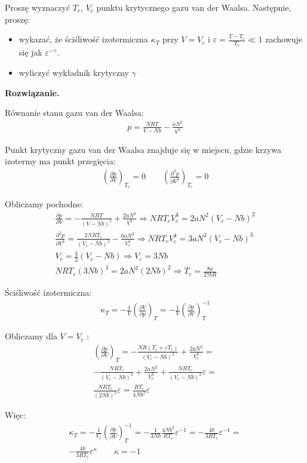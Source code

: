 \documentclass[11pt,a4paper]{article}
\newenvironment{solution}{\vspace{1cm} \par\textbf{Rozwiązanie.} \vspace{1cm}}{}
\begin{document}
Proszę wyznaczyć $T_c$, $V_c$ punktu krytycznego gazu van der Waalsa. 
Następnie, proszę:
\begin{itemize}
\item  wykazać, że ściśliwość izotermiczna $\kappa_T$ przy
$V = V_c$ i  $\varepsilon = \frac{T - T_c}{T_c} \ll 1$ zachowuje się jak 
$\varepsilon^{-\gamma}$. 
\item wyliczyć wykładnik krytyczny $\gamma$
\end{itemize}

\begin{solution}

Równanie stanu gazu van der Waalsa:
\begin{align*}
p = \frac{NRT}{V - Nb} - \frac{aN^2}{V^2}
\end{align*}

Punkt krytyczny gazu van der Waalsa znajduje się w miejscu, gdzie krzywa 
izotermy ma punkt przegięcia:
\begin{align*}
\left( \frac{\partial p}{\partial V} \right)_{T_c} = 0 \qquad
\left( \frac{\partial^2 p}{\partial V^2} \right)_{T_c} = 0
\end{align*}

Obliczamy pochodne:
\begin{align*}
\frac{\partial p}{\partial V} = -\frac{NRT}{(V - Nb)^2} + \frac{2aN^2}{V^3} \Rightarrow
NRT_cV^{3}_c = 2aN^2(V_c - Nb)^2 \\
\frac{\partial^2 p}{\partial V^2} = \frac{2NRT_c}{(V_c - Nb)^3} - \frac{6aN^2}{V_c^4} \Rightarrow
NRT_cV^{4}_c = 3aN^2(V_c - Nb)^3 \\
V_c = \frac{3}{2}(V_c - Nb) \Rightarrow V_c = 3Nb \\
NRT_c(3Nb)^3 = 2aN^2(2Nb)^2 \Rightarrow T_c = \frac{8a}{27bR}
\end{align*}

Ściśliwość izotermiczna:
\begin{align*}
\kappa_T = -\frac{1}{V} \left( \frac{\partial V}{\partial p} \right)_T = 
-\frac{1}{V} \left( \frac{\partial p}{\partial V} \right)^{-1}_T
\end{align*} 

Obliczamy dla $V = V_c$ :
\begin{align*}
\left( \frac{\partial p}{\partial V} \right)_T =
-\frac{NR(T_c + \varepsilon T_c)}{(V_c - Nb)^2} + \frac{2aN^2}{V_c^3} = \\
-\frac{NRT_c}{(V_c - Nb)^2} + \frac{2aN^2}{V_c^3} + 
\frac{NRT_c}{(V_c - Nb)^2} \varepsilon = \\
\frac{NRT_c}{(2Nb)^2} \varepsilon = \frac{RT_c}{4Nb^2} \varepsilon
\end{align*}

Więc:
\begin{align*}
\kappa_T = -\frac{1}{V_c} \left( \frac{\partial p}{\partial V} \right)^{-1}_T = 
-\frac{1}{3Nb} \frac{4Nb^2}{RT_c} \varepsilon^{-1} = 
-\frac{4b}{3RT_c} \varepsilon^{-1} = \\
-\frac{4b}{3RT_c} \varepsilon^{\kappa} \qquad \kappa = -1
\end{align*}



\newpage
\end{solution}
\end{document}
